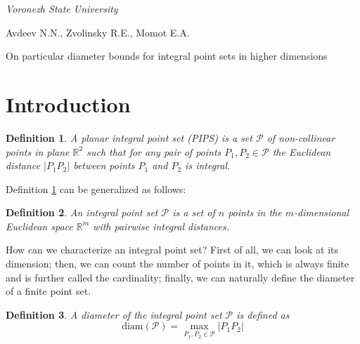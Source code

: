 \documentclass[12pt]{article}
\theoremstyle{theorem}
\theoremstyle{dfn}
\newtheorem{dfn}{Definition}
\theoremstyle{remark}
\begin{document}




\begin{center}
\emph{Voronezh State University}
\end{center}

Avdeev N.N., Zvolinsky R.E., Momot E.A.

On particular diameter bounds for integral point sets in higher dimensions


\section{Introduction}



\begin{dfn}\label{dfn1}
	A planar integral point set (PIPS) is a set $\mathcal{P}$
	of non-collinear points in plane $\mathbb{R}^{2}$ such that
	for any pair of points $P_{1}, P_{2} \in \mathcal{P}$
	the Euclidean distance $|P_{1}P_{2}|$
	between points $P_{1}$ and $P_{2}$ is integral.
\end{dfn}

Definition \ref{dfn1} can be generalized as follows:

\begin{dfn}
	An integral point set $\mathcal{P}$ is a set of $n$ points in
	the $m$-dimensional Euclidean space $\mathbb{R}^{m}$ with pairwise
	integral distances.
\end{dfn}

How can we characterize an integral point set?
First of all, we can look at its dimension;
then, we can count the number of points in it, which is always finite~\cite{anning1945integral,erdos1945integral}
and is further called the cardinality;
finally, we can naturally%
define the diameter of a finite point set.

\begin{dfn}
	A diameter of the integral point set $\mathcal{P}$ is defined as
	\begin{equation}
		\operatorname{diam(\mathcal{P})} = \underset{P_{1}, P_{2} \in
		\mathcal{P}}{\max} |P_{1}P_{2}|
	\end{equation}
\end{dfn}
\end{document}
